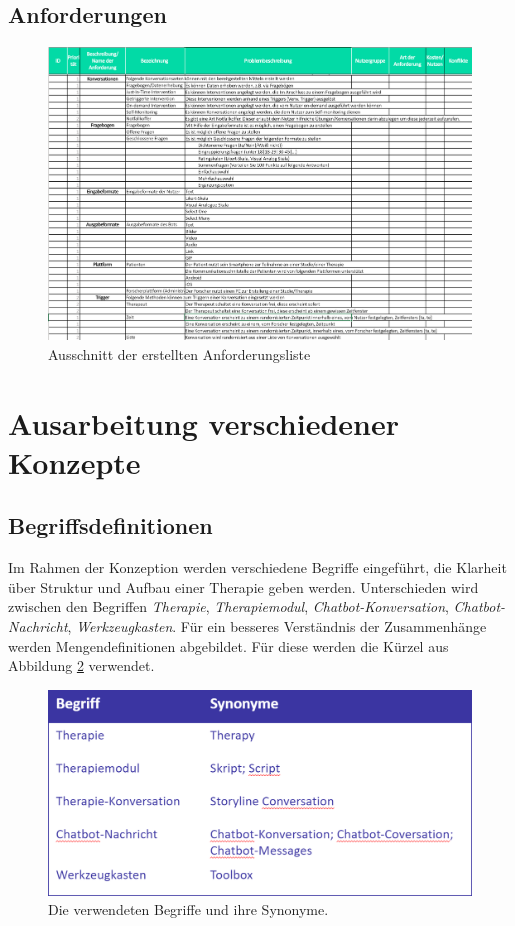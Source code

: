 \subsection{Anforderungen}

\begin{figure}[h]
\centering
\includegraphics[width=1\textwidth]{pictures/anforderungen}
\caption{Ausschnitt der erstellten Anforderungsliste}
\label{anforderungen}
\end{figure}

\section{Ausarbeitung verschiedener Konzepte}

\subsection{Begriffsdefinitionen}
Im Rahmen der Konzeption werden verschiedene Begriffe eingeführt, die Klarheit über Struktur und Aufbau einer Therapie geben werden. Unterschieden wird zwischen den Begriffen \emph{Therapie}, \emph{Therapiemodul}, \emph{Chatbot-Konversation}, \emph{Chatbot-Nachricht}, \emph{Werkzeugkasten}. Für ein besseres Verständnis der Zusammenhänge werden Mengendefinitionen abgebildet. Für diese werden die Kürzel aus Abbildung \ref{begriffe} verwendet.


\begin{figure}[h]
	\centering
	\includegraphics[width=.75\textwidth]{pictures/begriffe}
	\caption{Die verwendeten Begriffe und ihre Synonyme.}
	\label{begriffe}
\end{figure}

